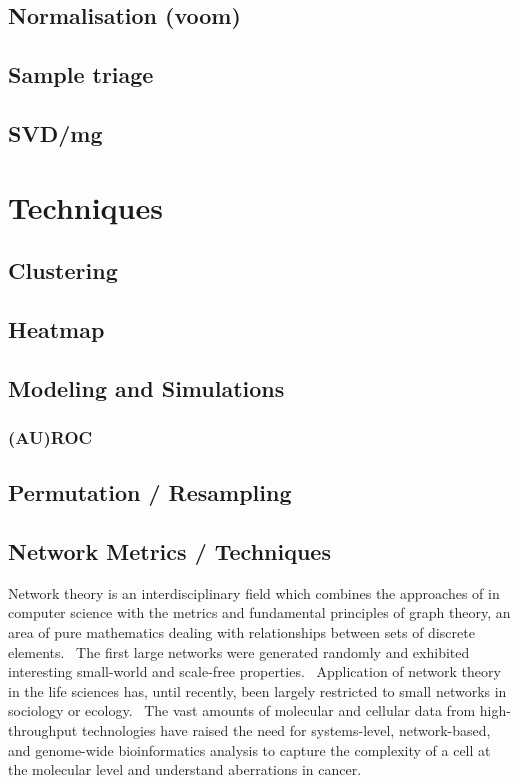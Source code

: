 \subsection{Normalisation (voom)}
\subsection{Sample triage}
\subsection{SVD/mg}
\section{Techniques}
\subsection{Clustering}
\subsection{Heatmap}
\subsection{Modeling and Simulations}
\subsubsection{(AU)ROC}
\subsection{Permutation / Resampling}
\subsection{Network Metrics / Techniques}

Network theory is an interdisciplinary field which combines the approaches of in computer science with the metrics and fundamental principles of graph theory, an area of pure mathematics dealing with relationships between sets of discrete elements. \ The first large networks were generated randomly and exhibited interesting small-world and scale-free properties. \ Application of network theory in the life sciences has, until recently, been largely restricted to small networks in sociology or ecology. \ The vast amounts of molecular and cellular data from high-throughput technologies have raised the need for systems-level, network-based, and genome-wide bioinformatics analysis to capture the complexity of a cell at the molecular level and understand aberrations in cancer. 

